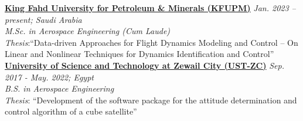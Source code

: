 \href{https://kfupm.edu.sa/}{\textbf{King Fahd University for Petroleum \& Minerals (KFUPM)}}
\hfill {\textit{Jan. 2023 – present; Saudi Arabia}}\\
\textit{M.Sc. in Aerospace Engineering (Cum Laude)}\\
\textit{Thesis}:``Data-driven Approaches for Flight Dynamics Modeling and Control -- On Linear and Nonlinear Techniques for Dynamics Identification and Control''\\

\vspace{0.1 cm}
\href{https://zewailcity.edu.eg/}{\textbf{University of Science and Technology at Zewail City (UST-ZC)}}
\hfill {\textit{Sep. 2017 - May. 2022; Egypt}}\\
\textit{B.S. in Aerospace Engineering}\\
\textit{Thesis}: {``Development of the software package for the attitude determination and control
algorithm of a cube satellite''} \\
